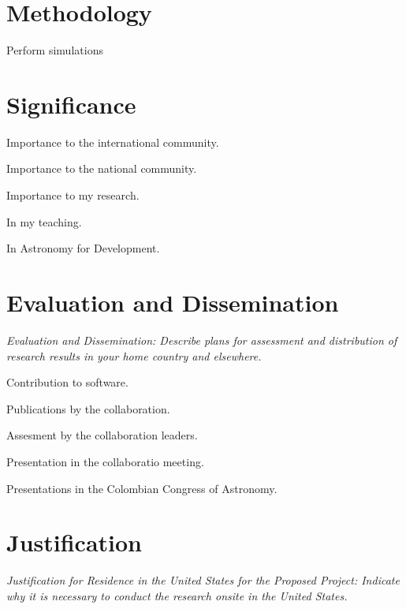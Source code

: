 \documentclass[12pt]{article}
\begin{document}
\section*{Methodology}
Perform simulations 

\section*{Significance}

Importance to the international community.

Importance to the national community.

Importance to my research.

In my teaching.

In Astronomy for Development.

\section*{Evaluation and Dissemination}
\textit{Evaluation and Dissemination: Describe plans for assessment and
distribution of research results in your home country and elsewhere.}

Contribution to software.

Publications by the collaboration.

Assesment by the collaboration leaders. 

Presentation in the collaboratio meeting.

Presentations in the Colombian Congress of Astronomy. 



\section*{Justification}
\textit{Justification for Residence in the United States for the Proposed
Project: Indicate why it is necessary to conduct the research onsite
 in the United States. }
\end{document}
